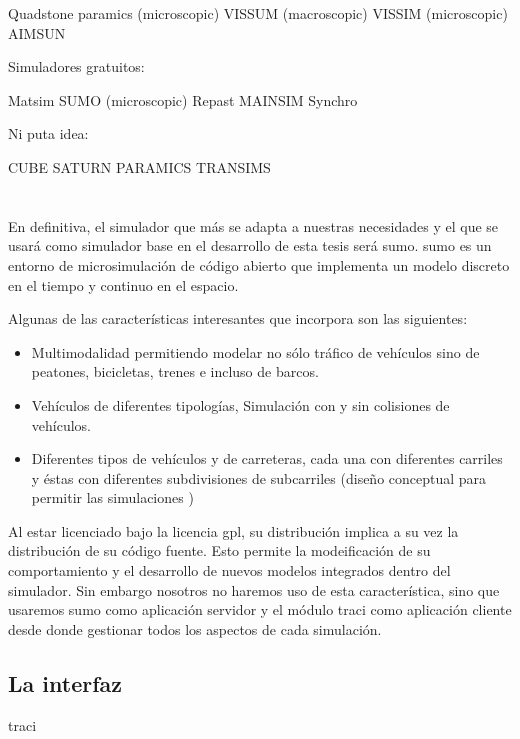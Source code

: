 Quadstone paramics (microscopic)
VISSUM (macroscopic)
VISSIM (microscopic)
AIMSUN

Simuladores gratuitos:

Matsim
SUMO (microscopic)
Repast
MAINSIM
Synchro

Ni puta idea:

CUBE
SATURN
PARAMICS
TRANSIMS

\section{}

En definitiva, el simulador que más se adapta a nuestras necesidades y el que se usará como simulador base en el desarrollo de esta tesis será \gls{sumo}. \gls{sumo} es un entorno de microsimulación de código abierto que implementa un modelo discreto en el tiempo y continuo en el espacio.

Algunas de las características interesantes que incorpora son las siguientes:

\begin{itemize}
	\item Multimodalidad permitiendo modelar no sólo tráfico de vehículos sino de peatones, bicicletas, trenes e incluso de barcos.
	\item Vehículos de diferentes tipologías, Simulación con y sin colisiones de vehículos.
	\item Diferentes tipos de vehículos y de carreteras, cada una con diferentes carriles y éstas con diferentes subdivisiones de subcarriles (diseño conceptual para permitir las simulaciones )
\end{itemize}

Al estar licenciado bajo la licencia \gls{gpl}, su distribución implica a su vez la distribución de su código fuente. Esto permite la modeificación de su comportamiento y el desarrollo de nuevos modelos integrados dentro del simulador. Sin embargo nosotros no haremos uso de esta característica, sino que usaremos \gls{sumo} como aplicación servidor y el módulo \gls{traci} como aplicación cliente desde donde gestionar todos los aspectos de cada simulación.

\subsection{La interfaz }

\gls{traci}